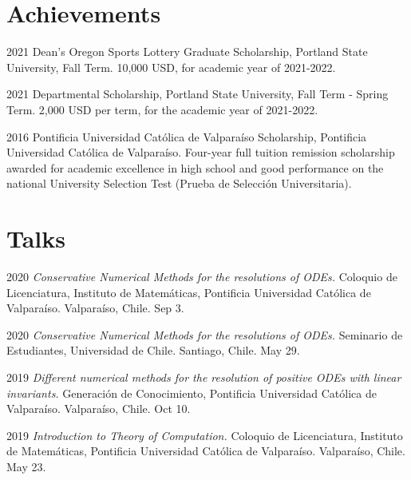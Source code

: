 \documentclass[12pt,letterpaper]{report}
\begin{document}
    \section*{Achievements}

    \begin{tablist}

        \item[2021] \tab Dean's Oregon Sports Lottery Graduate Scholarship, Portland State University, Fall Term. 10,000 USD, for academic year of 2021-2022.

        \item[2021] \tab Departmental Scholarship, Portland State University, Fall Term - Spring Term. 2,000 USD per term, for the academic year of 2021-2022.


        \item[2016] \tab Pontificia Universidad Cat\'olica de Valpara\'iso Scholarship, Pontificia Universidad Cat\'olica de Valpara\'iso. Four-year full tuition remission scholarship awarded for academic excellence in high school and good performance on the national University Selection Test (Prueba de Selecci\'on Universitaria).

    \end{tablist}

    \section*{Talks}

    \begin{tablist}

        \item[2020] \tab \emph{Conservative Numerical Methods for the resolutions of ODEs.} Coloquio de Licenciatura, Instituto de Matem\'aticas, Pontificia Universidad Cat\'olica de Valpara\'iso. Valpara\'iso, Chile. Sep 3.
         
        \item[2020] \tab \emph{Conservative Numerical Methods for the resolutions of ODEs.} Seminario de Estudiantes, Universidad de Chile. Santiago, Chile. May 29.

    	\item[2019] \tab \emph{Different numerical methods for the resolution of positive ODEs with linear invariants.} Generaci\'on de Conocimiento, Pontificia Universidad Cat\'olica de Valpara\'iso. Valpara\'iso, Chile. Oct 10.
    
    	\item[2019] \tab \emph{Introduction to Theory of Computation.} Coloquio de Licenciatura, Instituto de Matem\'aticas, Pontificia Universidad Cat\'olica de Valpara\'iso. Valpara\'iso, Chile. May 23.
    	
    \end{tablist}
\end{document}
